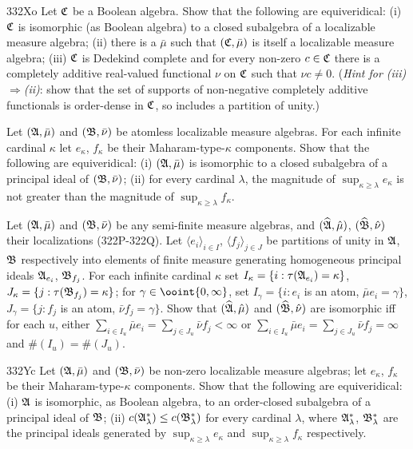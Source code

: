 {\spheader 332Xo Let $\frak C$ be a Boolean algebra.    Show that
the following are equiveridical:  (i) $\frak C$ is isomorphic (as Boolean
algebra) to a closed subalgebra of a localizable measure algebra;  (ii)
there is a $\bar\mu$ such that $(\frak C,\bar\mu)$ is itself a
localizable measure algebra;   (iii) $\frak C$ is Dedekind complete and
for every non-zero $c\in\frak C$ there is a completely additive
real-valued functional
$\nu$ on $\frak C$ such that $\nu c\ne 0$.   ({\it Hint for
(iii)$\Rightarrow$(ii)\/}:  show that the set of supports of
non-negative
completely additive functionals is order-dense in $\frak C$, so includes
a partition of unity.)

Let $(\frak A,\bar\mu)$ and
$(\frak B,\bar\nu)$ be atomless localizable measure algebras.   For each
infinite cardinal $\kappa$ let $e_{\kappa}$, $f_{\kappa}$ be their
Maharam-type-$\kappa$ components.   Show that the following are
equiveridical:  (i) $(\frak A,\bar\mu)$ is isomorphic to a closed
subalgebra of a principal ideal of $(\frak B,\bar\nu)$;
(ii) for every cardinal $\lambda$,
the magnitude of $\sup_{\kappa\ge\lambda}e_{\kappa}$ is not greater than
the magnitude of $\sup_{\kappa\ge\lambda}f_{\kappa}$.

 Let $(\frak A,\bar\mu)$ and $(\frak B,\bar\nu)$
be any semi-finite measure algebras, and $(\widehat{\frak A},\hat\mu)$,
$(\widehat{\frak B},\hat\nu)$ their localizations (322P-322Q).   Let
$\langle e_i\rangle_{i\in I}$, $\langle f_j\rangle_{j\in J}$ be
partitions of
unity in $\frak A$, $\frak B$ respectively into elements of finite
measure generating homogeneous principal ideals $\frak A_{e_i}$,
$\frak B_{f_j}$.   For each infinite cardinal $\kappa$ set
$I_{\kappa}=\{i:\tau(\frak A_{e_i})=\kappa\}$,
$J_{\kappa}=\{j:\tau(\frak B_{f_j})=\kappa\}$;  for
$\gamma\in\ooint{0,\infty}$, set $I_{\gamma}=\{i:e_i$ is an atom,
$\bar\mu e_i=\gamma\}$, $J_{\gamma}=\{j:f_j$ is an atom,
$\bar\nu f_j=\gamma\}$.   Show that $(\widehat{\frak A},\hat\mu)$ and
$(\widehat{\frak B},\hat\nu)$ are isomorphic iff for each $u$, either
$\sum_{i\in I_u}\bar\mu e_i=\sum_{j\in J_u}\bar\nu f_j<\infty$
or $\sum_{i\in I_u}\bar\mu e_i=\sum_{j\in J_u}\bar\nu f_j=\infty$ and
$\#(I_u)=\#(J_u)$.

\spheader 332Yc Let $(\frak A,\bar\mu)$ and $(\frak B,\bar\nu)$ be
non-zero localizable measure algebras;  let $e_{\kappa}$, $f_{\kappa}$
be their Maharam-type-$\kappa$ components.   Show that the following are
equiveridical:  (i) $\frak A$ is isomorphic, as Boolean algebra, to an
order-closed subalgebra of a principal ideal of $\frak B$;   (ii)
$c(\frak A^*_{\lambda})\le c(\frak B^*_{\lambda})$ for every cardinal
$\lambda$, where $\frak A^*_{\lambda}$, $\frak B^*_{\lambda}$ are the
principal ideals generated by $\sup_{\kappa\ge\lambda}e_{\kappa}$ and
$\sup_{\kappa\ge\lambda}f_{\kappa}$ respectively.

}%

